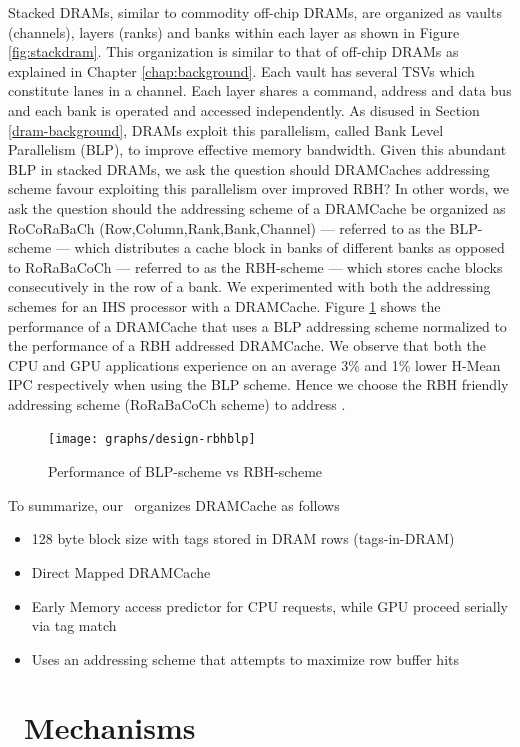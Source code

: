Stacked DRAMs, similar to commodity off-chip DRAMs, are organized as vaults (channels), layers (ranks) and banks within each layer as shown in Figure \ref{fig:stackdram}. This organization is similar to that of off-chip DRAMs as explained in Chapter \ref{chap:background}. Each vault has several TSVs which constitute lanes in a channel. Each layer shares a command, address and data bus and each bank is  operated and accessed independently. As disused in Section \ref{dram-background}, DRAMs exploit this parallelism, called Bank Level Parallelism (BLP), to improve effective memory bandwidth. Given this abundant BLP in stacked DRAMs, we ask the question should DRAMCaches addressing scheme favour exploiting this parallelism over improved RBH? In other words, we ask the question should the addressing scheme of a DRAMCache be organized as RoCoRaBaCh (Row,Column,Rank,Bank,Channel) --- referred to as the BLP-scheme --- which distributes a cache block in banks of different banks as opposed to RoRaBaCoCh --- referred to as the RBH-scheme --- which stores cache blocks consecutively in the row of a bank. We experimented with both the addressing schemes for an IHS processor with a DRAMCache. Figure \ref{fig:design-rbhblp} shows the performance of a DRAMCache that uses a BLP addressing scheme normalized to the performance of a RBH addressed DRAMCache. We observe that both the CPU and GPU applications experience on an average 3\% and 1\% lower H-Mean IPC respectively when using the BLP scheme. Hence we choose the RBH friendly addressing scheme (RoRaBaCoCh scheme) to address \cachename.
\begin{figure}[!htb]
	\centering
	\texttt{[image: graphs/design-rbhblp]}
	\caption{Performance of BLP-scheme vs RBH-scheme}
	\label{fig:design-rbhblp}
\end{figure}

\par To summarize, our \cachename\ organizes DRAMCache as follows
\begin{itemize}
	\item 128 byte block size with tags stored in DRAM rows (tags-in-DRAM)
	\item Direct Mapped DRAMCache
	\item Early Memory access predictor for CPU requests, while GPU proceed serially via tag match
	\item Uses an addressing scheme that attempts to maximize row buffer hits
\end{itemize}


\section{\cachename\ Mechanisms}

